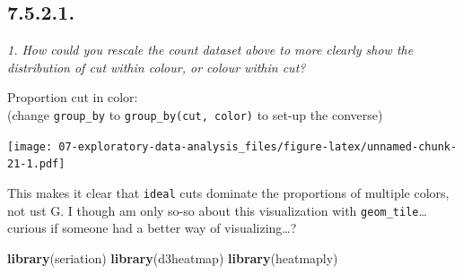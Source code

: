 \documentclass[]{book}
\newenvironment{Shaded}{\begin{snugshade}}{\end{snugshade}}
\newcommand{\CharTok}[1]{\textcolor[rgb]{0.31,0.60,0.02}{#1}}
\newcommand{\DataTypeTok}[1]{\textcolor[rgb]{0.13,0.29,0.53}{#1}}
\newcommand{\KeywordTok}[1]{\textcolor[rgb]{0.13,0.29,0.53}{\textbf{#1}}}
\newcommand{\NormalTok}[1]{#1}
\newcommand{\OperatorTok}[1]{\textcolor[rgb]{0.81,0.36,0.00}{\textbf{#1}}}
\newcommand{\StringTok}[1]{\textcolor[rgb]{0.31,0.60,0.02}{#1}}
\theoremstyle{definition}
\theoremstyle{definition}
\theoremstyle{definition}
\theoremstyle{remark}
\begin{document}
\hypertarget{section-24}{%
\subsection{7.5.2.1.}\label{section-24}}

\emph{1. How could you rescale the count dataset above to more clearly
show the distribution of cut within colour, or colour within cut?}

Proportion cut in color:\\
(change \texttt{group\_by} to \texttt{group\_by(cut,\ color)} to set-up
the converse)

\begin{Shaded}
\end{Shaded}

\texttt{[image: 07-exploratory-data-analysis\_files/figure-latex/unnamed-chunk-21-1.pdf]}

This makes it clear that \texttt{ideal} cuts dominate the proportions of
multiple colors, not ust G. I though am only so-so about this
visualization with \texttt{geom\_tile}\ldots{} curious if someone had a
better way of visualizing\ldots{}?

\begin{Shaded}
\begin{Highlighting}[]
\KeywordTok{library}\NormalTok{(seriation)}
\KeywordTok{library}\NormalTok{(d3heatmap)}
\KeywordTok{library}\NormalTok{(heatmaply)}
\end{Highlighting}
\end{Shaded}
\end{document}
